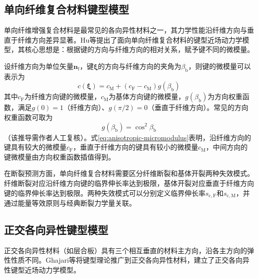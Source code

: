 \subsection{单向纤维复合材料键型模型}\label{sec:unidirectional-fiber}

单向纤维增强复合材料是最常见的各向异性材料之一，其力学性能沿纤维方向与垂直于纤维方向差异显著。Hu等\cite{HuHaBobaru2012}提出了面向单向纤维复合材料的键型近场动力学模型，其核心思想是：根据键的方向与纤维方向的相对关系，赋予键不同的微模量。

设纤维方向为单位矢量$\mathbf{n}_{\mathrm{f}}$，键$\boldsymbol{\xi}$的方向与纤维方向的夹角为$\beta_{\mathrm{b}}$，则键的微模量可以表示为
\begin{equation}
  c(\boldsymbol{\xi})=c_{\mathrm{M}}+(c_{\mathrm{F}}-c_{\mathrm{M}})g(\beta_{\mathrm{b}})
  \label{eq:anisotropic-micromodulus}
\end{equation}
其中$c_{\mathrm{F}}$为纤维方向键的微模量，$c_{\mathrm{M}}$为基体方向键的微模量，$g(\beta_{\mathrm{b}})$为方向权重函数，满足$g(0)=1$（纤维方向）、$g(\pi/2)=0$（垂直于纤维方向）。常见的方向权重函数可取为
\begin{equation}
  g(\beta_{\mathrm{b}})=\cos^{2}\beta_{\mathrm{b}}
  \label{eq:direction-weight}
\end{equation}
（该推导需作者人工复核）。式\eqref{eq:anisotropic-micromodulus}表明，沿纤维方向的键具有较大的微模量$c_{\mathrm{F}}$，垂直于纤维方向的键具有较小的微模量$c_{\mathrm{M}}$，中间方向的键微模量由方向权重函数插值得到。

在断裂预测方面，单向纤维复合材料需要区分纤维断裂和基体开裂两种失效模式。纤维断裂对应沿纤维方向键的临界伸长率达到极限，基体开裂对应垂直于纤维方向键的临界伸长率达到极限。两种失效模式可以分别定义临界伸长率$s_{\mathrm{c,F}}$和$s_{\mathrm{c,M}}$，并通过能量等效原则与经典断裂力学量关联。


\subsection{正交各向异性键型模型}\label{sec:orthotropic-bond}

正交各向异性材料（如层合板）具有三个相互垂直的材料主方向，沿各主方向的弹性性质不同。Ghajari等\cite{Ghajari2014}将键型理论推广到正交各向异性材料，建立了正交各向异性键型近场动力学模型。


